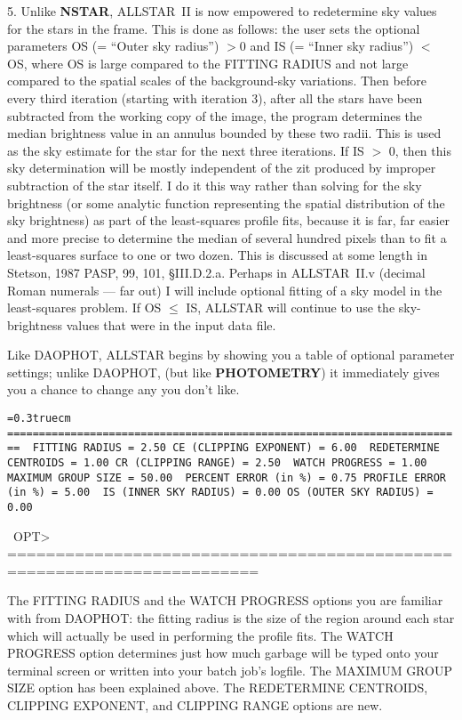 \item{5.}  Unlike {\bf NSTAR}, ALLSTAR~II is now empowered to
redetermine sky values for the stars in the frame.  This is done as
follows:  the user sets the optional parameters OS (= ``Outer sky
radius'') $> 0$ and IS (= ``Inner sky radius'') $<$ OS, where OS is
large compared to the FITTING RADIUS and not large compared to the
spatial scales of the background-sky variations. Then before every
third iteration (starting with iteration 3), after all the stars have
been subtracted from the working copy of the image, the program
determines the median brightness value in an annulus bounded by these
two radii.  This is used as the sky estimate for the star for the next
three iterations.  If IS $>$ 0, then this sky determination will be
mostly independent of the zit produced by improper subtraction of the
star itself.  I do it this way rather than solving for the sky
brightness (or some analytic function representing the spatial
distribution of the sky brightness) as part of the least-squares
profile fits, because it is far, far easier and more precise to
determine the median of several hundred pixels than to fit a
least-squares surface to one or two dozen.  This is discussed at some
length in Stetson, 1987 PASP, 99, 101, \S III.D.2.a.  Perhaps in
ALLSTAR~II.v (decimal Roman numerals --- far out) I will include
optional fitting of a sky model in the least-squares problem.  If OS
$\leq$ IS, ALLSTAR will continue to use the sky-brightness values that
were in the input data file.

Like DAOPHOT, ALLSTAR begins by showing you a table of optional
parameter settings; unlike DAOPHOT, (but like {\bf PHOTOMETRY}) it
immediately gives you a chance to change any you don't like.

\bigskip
{\noindent\obeylines\obeyspaces\frenchspacing\tt\baselineskip=0.3truecm
========================================================================
\           FITTING RADIUS =  2.50       CE (CLIPPING EXPONENT) =  6.00
\    REDETERMINE CENTROIDS =  1.00          CR (CLIPPING RANGE) =  2.50
\           WATCH PROGRESS =  1.00           MAXIMUM GROUP SIZE = 50.00
\     PERCENT ERROR (in \%) =  0.75         PROFILE ERROR (in \%) =  5.00
\    IS (INNER SKY RADIUS) =  0.00        OS (OUTER SKY RADIUS) =  0.00

\ OPT>
========================================================================
}
\bigskip

The FITTING RADIUS and the WATCH PROGRESS options you are familiar with
from DAOPHOT:  the fitting radius is the size of the region around each
star which will actually be used in performing the profile fits.  The
WATCH PROGRESS option determines just how much garbage will be typed
onto your terminal screen or written into your batch job's logfile.  The
MAXIMUM GROUP SIZE option has been explained above.  The REDETERMINE
CENTROIDS, CLIPPING EXPONENT, and CLIPPING RANGE options are new.

